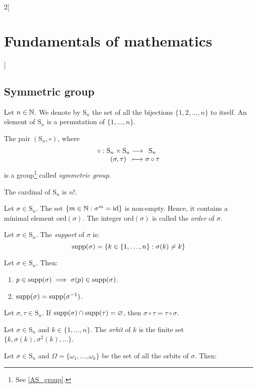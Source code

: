 \documentclass[../../../main_math.tex]{subfiles}
\begin{document}
\begin{multicols}{2}[\section{Fundamentals of mathematics}]
  \subsection{Symmetric group}
  \begin{definition}
    Let $n\in\mathbb{N}$. We denote by $\text{S}_n$ the set of all the bijections $\{1,2,\ldots,n\}$ to itself. An element of $\text{S}_n$ is a permutation of $\{1,\ldots,n\}$.
  \end{definition}
  \begin{proposition}
    The pair $(\text{S}_n,\circ)$, where
    $$\function{\circ}{\text{S}_n\times \text{S}_n}{\text{S}_n}{(\sigma,\tau)}{\sigma\circ\tau}$$
    is a group\footnote{See \cref{AS_group}.} called \emph{symmetric group}.
  \end{proposition}
  \begin{theorem}
    The cardinal of $\text{S}_n$ is $n!$.
  \end{theorem}
  \begin{definition}
    Let $\sigma\in \text{S}_n$. The set $\{m\in\mathbb{N}:\sigma^m=\text{id}\}$ is non-empty. Hence, it contains a minimal element $\text{ord}(\sigma)$. The integer $\text{ord}(\sigma)$ is called the \emph{order} of $\sigma$.
  \end{definition}
  \begin{definition}
    Let $\sigma\in \text{S}_n$. The \emph{support} of $\sigma$ is: $$\operatorname{supp}(\sigma)=\{k\in\{1,\ldots,n\}: \sigma(k)\ne k\}$$
  \end{definition}
  \begin{lemma}
    Let $\sigma\in \text{S}_n$. Then:
    \begin{enumerate}
      \item $p\in\operatorname{supp}(\sigma)\implies \sigma(p)\in\operatorname{supp}(\sigma)$.
      \item $\operatorname{supp}(\sigma)=\operatorname{supp}(\sigma^{-1})$.
    \end{enumerate}
  \end{lemma}
  \begin{lemma}
    Let $\sigma,\tau\in \text{S}_n$. If $\operatorname{supp}(\sigma)\cap\operatorname{supp}(\tau)=\varnothing$, then $\sigma\circ \tau=\tau\circ \sigma$.
  \end{lemma}
  \begin{definition}
    Let $\sigma\in \text{S}_n$ and $k\in\{1,\ldots,n\}$. The \emph{orbit} of $k$ is the finite set $\{k,\sigma(k),\sigma^2(k),\ldots\}$.
  \end{definition}
  \begin{theorem}
    Let $\sigma\in \text{S}_n$ and $\Omega=\{\omega_1,\ldots,\omega_k\}$ be the set of all the orbits of $\sigma$. Then:

\end{theorem}
\end{multicols}
\end{document}
